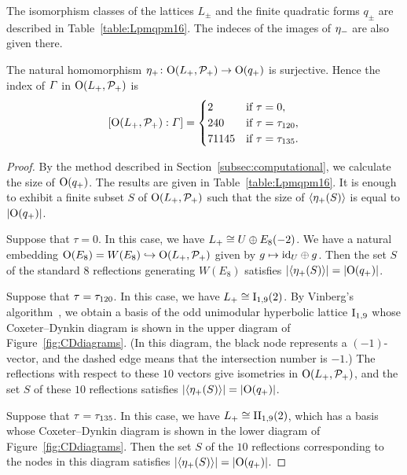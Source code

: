 \documentclass{amsart} %
\begin{document}
%
The isomorphism classes of the lattices $L_{\pm}$ and 
the finite quadratic forms $q_{\pm}$ are described in Table~\ref{table:Lpmqpm16}.
The indeces of the images of ${\eta}_{-}$ are also given there.
%
\begin{proposition}\label{prop:etaplussurj16}
The natural homomorphism ${\eta}_{+}\colon \mathord{\mathrm{O}}(L_{+}, \mathord{\mathcal{P}}_{+})\to \mathord{\mathrm{O}}(q_{+})$ is surjective.
Hence the index of $\varGamma$ in $\mathord{\mathrm{O}}(L_{+}, \mathord{\mathcal{P}}_{+})$ is
\[
[\mathord{\mathrm{O}}(L_{+}, \mathord{\mathcal{P}}_{+}): \varGamma]=
\begin{cases}
2 & \textrm{if $\tau=0$}, \\
240 & \textrm{if $\tau= \tau_{120}$}, \\
71145 & \textrm{if $\tau= \tau_{135}$}.
\end{cases}
\]
\end{proposition}
%
\begin{proof}
By the method described in Section~\ref{subsec:computational},
we calculate the size of $\mathord{\mathrm{O}}(q_{+})$.
The results are given in Table~\ref{table:Lpmqpm16}.
It is enough to exhibit a finite subset $S$ 
of $\mathord{\mathrm{O}}(L_{+}, \mathord{\mathcal{P}}_{+})$ such that 
the size of $\langle {{\eta}_{+}(S)} \rangle$ is equal to $|\mathord{\mathrm{O}}(q_{+})|$.
\par
Suppose that $\tau=0$.
In this case,
we have $L_{+}\cong U\oplus E_8(-2)$.
We have a natural embedding $\mathord{\mathrm{O}}(E_8)=W(E_8)\hookrightarrow \mathord{\mathrm{O}}(L_{+}, \mathord{\mathcal{P}}_{+})$
given by $g\mapsto \mathord{\mathrm{id}}_U \oplus g$.
Then %
the set $S$ of the standard $8$ reflections generating $W(E_8)$ 
satisfies $|\langle {{\eta}_{+}(S)} \rangle|=|\mathord{\mathrm{O}}(q_{+})|$.
%
\par
Suppose that $\tau= \tau_{120}$.
In this case,
we have $L_{+}\cong \mathrm{I}_{1, 9}(2)$.
By Vinberg’s algorithm~\cite{Vinberg1985}, 
we obtain a basis of the odd unimodular hyperbolic lattice $\mathrm{I}_{1,9}$ 
whose Coxeter–Dynkin diagram is shown in the upper diagram of Figure~\ref{fig:CDdiagrams}. 
(In this diagram, 
the black node represents a $(-1)$-vector, and 
the dashed edge means that  the intersection number is $-1$.)
The reflections 
with respect to these $10$ vectors
give isometries in $\mathord{\mathrm{O}}(L_{+}, \mathord{\mathcal{P}}_{+})$, and 
 the set $S$ of these $10$ reflections
satisfies $|\langle {{\eta}_{+}(S)} \rangle|=|\mathord{\mathrm{O}}(q_{+})|$.
%
\par
Suppose that $\tau= \tau_{135}$.
In this case,
we have $L_{+}\cong \mathrm{II}_{1, 9}(2)$,
which 
has a basis 
whose Coxeter–Dynkin diagram is shown in the lower diagram of Figure~\ref{fig:CDdiagrams}. 
Then the set $S$ of the
 $10$ reflections corresponding to the nodes in this diagram
satisfies $|\langle {{\eta}_{+}(S)} \rangle|=|\mathord{\mathrm{O}}(q_{+})|$.

\end{proof}
\end{document}
